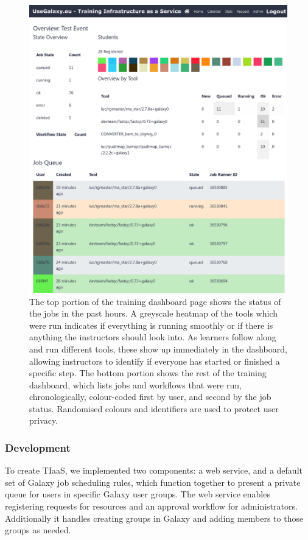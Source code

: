 \documentclass[a4paper,num-refs]{oup-contemporary}
\begin{document}
\begin{figure}[bt!]
\centering
\includegraphics[width=\linewidth]{images/dashboard.png}
\caption{The top portion of the training dashboard page shows the status of the jobs in the past hours. A greyscale heatmap of the tools which were run indicates if everything is running smoothly or if there is anything the instructors should look into. As learners follow along and run different tools, these show up immediately in the dashboard, allowing instructors to identify if everyone has started or finished a specific step. The bottom portion shows the rest of the training dashboard, which lists jobs and workflows that were run, chronologically, colour-coded first by user, and second by the job status. Randomised colours and identifiers are used to protect user privacy.}\label{figure:dashboard}
\end{figure}

\subsubsection{Development}

To create TIaaS, we implemented two components: a web service, and a default set of Galaxy job scheduling rules, which function together to present a private queue for users in specific Galaxy user groups. The web service enables registering requests for resources and an approval workflow for administrators. Additionally it handles creating groups in Galaxy and adding members to those groups as needed.
\end{document}
